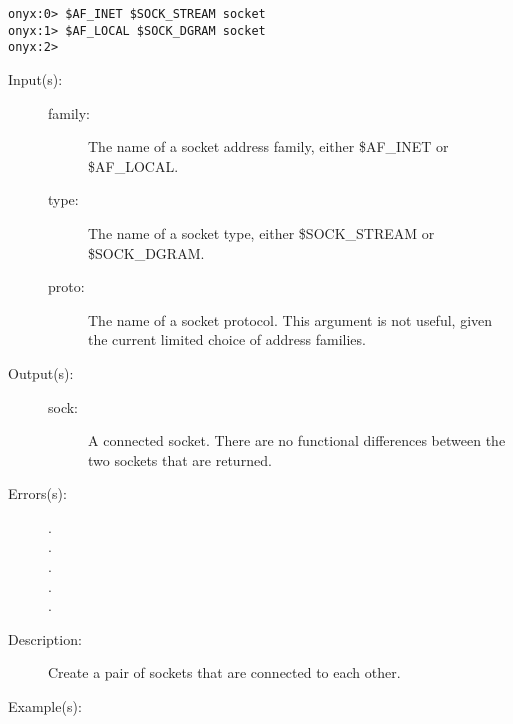 \begin{description}
\begin{description}
\begin{verbatim}
onyx:0> $AF_INET $SOCK_STREAM socket
onyx:1> $AF_LOCAL $SOCK_DGRAM socket
onyx:2>
		\end{verbatim}
	\end{description}
\label{systemdict:socketpair}
\item[{\onyxop{family type proto}{socketpair}{sock sock}}: ]
\item[{\onyxop{family type}{socketpair}{sock sock}}: ]
	\begin{description}\item[]
	\item[Input(s): ]
		\begin{description}\item[]
		\item[family: ]
			The name of a socket address family, either \$AF\_INET
			or \$AF\_LOCAL.
		\item[type: ]
			The name of a socket type, either \$SOCK\_STREAM or
			\$SOCK\_DGRAM.
		\item[proto: ]
			The name of a socket protocol.  This argument is not
			useful, given the current limited choice of address
			families.
		\end{description}
	\item[Output(s): ]
		\begin{description}\item[]
		\item[sock: ]
			A connected socket.  There are no functional differences
			between the two sockets that are returned.
		\end{description}
	\item[Errors(s): ]
		\begin{description}\item[]
		\item[.]
		\item[.]
		\item[.]
		\item[.]
		\item[.]
		\end{description}
	\item[Description: ]
		Create a pair of sockets that are connected to each other.
	\item[Example(s): ]\begin{verbatim}


\end{verbatim}
\end{description}
\end{description}
